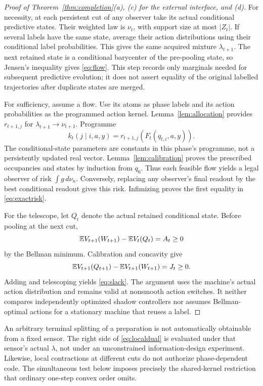 \begin{proof}[Proof of Theorem~\ref{thm:completion}(a), (c) for the external interface, and (d)]
For necessity, at each persistent cut of any observer take its actual conditional predictive states. Their weighted law is $\nu_t$, with support size at most $|Z_t|$. If several labels have the same state, average their action distributions using their conditional label probabilities. This gives the same acquired mixture $\lambda_{t+1}$. The next retained state is a conditional barycenter of the pre-pooling state, so Jensen's inequality gives \eqref{eq:flow}. This step records only marginals needed for subsequent predictive evolution; it does not assert equality of the original labelled trajectories after duplicate states are merged.

For sufficiency, assume a flow. Use its atoms as phase labels and its action probabilities as the programmed action kernel. Lemma~\ref{lem:allocation} provides $r_{t+1,j}$ for $\lambda_{t+1}\to\nu_{t+1}$. Programme
\[
 k_t(j\mid i,a,y)=r_{t+1,j}(F_t(q_{t,i},a,y)).
\]
The conditional-state parameters are constants in this phase's programme, not a persistently updated real vector. Lemma~\ref{lem:calibration} proves the prescribed occupancies and states by induction from $q_0$. Thus each feasible flow yields a legal observer of risk $\int g\,d\nu_n$. Conversely, replacing any observer's final readout by the best conditional readout gives this risk. Infimizing proves the first equality in \eqref{eq:exactrisk}.

For the telescope, let $Q_t$ denote the actual retained conditional state. Before pooling at the next cut,
\[
 \mathbb E V_{t+1}(W_{t+1})-\mathbb E V_t(Q_t)=A_t\ge0
\]
by the Bellman minimum. Calibration and concavity give
\[
 \mathbb E V_{t+1}(Q_{t+1})-\mathbb E V_{t+1}(W_{t+1})=J_t\ge0.
\]
Adding and telescoping yields \eqref{eq:slack}. The argument uses the machine's actual action distribution and remains valid at nonsmooth action switches. It neither compares independently optimized shadow controllers nor assumes Bellman-optimal actions for a stationary machine that reuses a label.
\end{proof}

\begin{remark}\label{rem:dual}
An arbitrary terminal splitting of a preparation is not automatically obtainable from a fixed sensor. The right side of \eqref{eq:localdual} is evaluated under that sensor's actual $\lambda$, not under an unconstrained information-design experiment. Likewise, local contractions at different cuts do not authorize phase-dependent code. The simultaneous test below imposes precisely the shared-kernel restriction that ordinary one-step convex order omits.
\end{remark}


